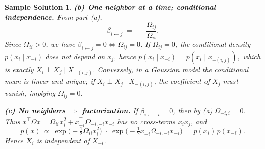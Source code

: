 \documentclass[11pt]{article}
\newtheorem*{solution}{Sample Solution}
\begin{document}
\begin{solution}
\bigskip
\textbf{(b) One neighbor at a time; conditional independence.}
From part (a),
\[
\beta_{i\leftarrow j} \;=\; -\,\frac{\Omega_{ij}}{\Omega_{ii}} .
\]
Since \(\Omega_{ii}>0\), we have \(\beta_{i\leftarrow j}=0 \iff \Omega_{ij}=0\).
If \(\Omega_{ij}=0\), the conditional density \(p(x_i\mid x_{-i})\) does not depend on \(x_j\), hence
\(
p(x_i\mid x_{-i}) = p(x_i\mid x_{-(i,j)}),
\)
which is exactly \(X_i \perp X_j \mid X_{-(i,j)}\).
Conversely, in a Gaussian model the conditional mean is linear and unique; if
\(X_i \perp X_j \mid X_{-(i,j)}\), the coefficient of \(X_j\) must vanish, implying \(\Omega_{ij}=0\).

\bigskip
\textbf{(c) No neighbors \(\Rightarrow\) factorization.}
If \(\beta_{i\leftarrow -i}=0\), then by (a) \(\Omega_{-i,i}=0\).
Thus
\(
x^\top \Omega x = \Omega_{ii} x_i^2 + x_{-i}^\top \Omega_{-i,-i} x_{-i}
\)
has no cross-terms \(x_i x_j\), and
\[
p(x)\ \propto\ \exp\!\Big(-\tfrac12 \Omega_{ii} x_i^2\Big)\;\cdot\;
\exp\!\Big(-\tfrac12 x_{-i}^\top \Omega_{-i,-i} x_{-i}\Big)
=\ p(x_i)\,p(x_{-i}).
\]
Hence \(X_i\) is independent of \(X_{-i}\).
\end{solution}
\end{document}

